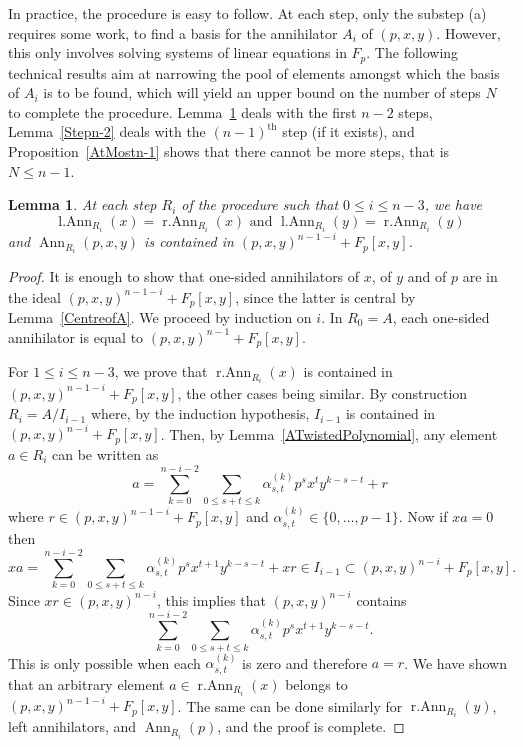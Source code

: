 \documentclass[11pt]{article}
\DeclareMathOperator{\Ann}{Ann}
\DeclareMathOperator{\lAnn}{l.Ann}
\DeclareMathOperator{\rAnn}{r.Ann}
\newtheorem{lemma}[corollary]{Lemma}
\theoremstyle{definition}
\begin{document}
In practice, the procedure is easy to follow. At each step, only the substep (a) requires some work, to find a basis for the annihilator $A_i$ of $(p,x,y)$. However, this only involves solving systems of linear equations in $F_p$. The following technical results aim at narrowing the pool of elements amongst which the basis of $A_i$ is to be found, which will yield an upper bound on the number of steps $N$ to complete the procedure. Lemma~\ref{FirstStepsSymmetric} deals with the first $n-2$ steps, Lemma~\ref{Stepn-2} deals with the $(n-1)^\text{th}$ step (if it exists), and Proposition~\ref{AtMostn-1} shows that there cannot be more steps, that is $N\leq n-1$.

\begin{lemma}\label{FirstStepsSymmetric}
At each step $R_i$ of the procedure such that $0\leq i\leq n-3$, we have
\[\lAnn_{R_i}(x)=\rAnn_{R_i}(x)\text{ and }\lAnn_{R_i}(y)=\rAnn_{R_i}(y)\]
and $\Ann_{R_i}(p,x,y)$ is contained in $(p,x,y)^{n-1-i}+F_p[x,y]$.
\end{lemma}

\begin{proof}
It is enough to show that one-sided annihilators of $x$, of $y$ and of $p$ are in the ideal $(p,x,y)^{n-1-i}+F_p[x,y]$, since the latter is central by Lemma~\ref{CentreofA}.
We proceed by induction on $i$. In $R_0=A$, each one-sided annihilator is equal to $(p,x,y)^{n-1}+F_p[x,y]$.

For $1\leq i\leq n-3$, we prove that $\rAnn_{R_i}(x)$ is contained in $(p,x,y)^{n-1-i}+F_p[x,y]$, the other cases being similar. By construction $R_i=A/I_{i-1}$ where, by the induction hypothesis, $I_{i-1}$ is contained in $(p,x,y)^{n-i}+F_p[x,y]$. Then, by Lemma~\ref{ATwistedPolynomial}, any element $a\in R_i$ can be written as
\[a=\sum_{k=0}^{n-i-2}\sum_{0\leq s+t\leq k} \alpha_{s,t}^{(k)}p^sx^ty^{k-s-t}+r\]
where $r\in (p,x,y)^{n-1-i}+F_p[x,y]$ and $\alpha_{s,t}^{(k)}\in\lbrace0,\ldots,p-1\rbrace$. Now if $xa=0$ then
\[xa=\sum_{k=0}^{n-i-2}\sum_{0\leq s+t\leq k} \alpha_{s,t}^{(k)}p^{s}x^{t+1}y^{k-s-t}+xr\in I_{i-1}\subset(p,x,y)^{n-i}+F_p[x,y].\]
Since $xr\in (p,x,y)^{n-i}$, this implies that $(p,x,y)^{n-i}$ contains
\[\sum_{k=0}^{n-i-2}\sum_{0\leq s+t\leq k} \alpha_{s,t}^{(k)}p^{s}x^{t+1}y^{k-s-t}.\]
This is only possible when each $\alpha_{s,t}^{(k)}$ is zero and therefore $a=r$. We have shown that an arbitrary element $a\in\rAnn_{R_i}(x)$ belongs to $(p,x,y)^{n-1-i}+F_p[x,y]$. The same can be done similarly for $\rAnn_{R_i}(y)$, left annihilators, and $\Ann_{R_i}(p)$, and the proof is complete.
\end{proof}
\end{document}
